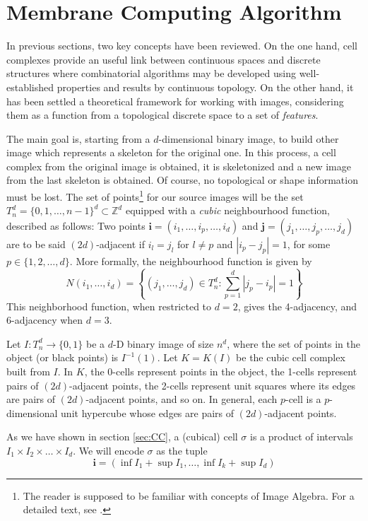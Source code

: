 \documentclass[journal]{IEEEtran}
\begin{document}
\section{Membrane Computing Algorithm}\label{sec:MCA}
In previous sections, two key concepts have been reviewed. On the one hand, cell
complexes provide an useful link between continuous spaces and discrete
structures where combinatorial algorithms may be developed using
well-established properties and results by continuous topology. On the other
hand, it has been settled a theoretical framework for working with images,
considering them as a function from a topological discrete space to a set of
{\it features}.

The main goal is, starting from a $d$-dimensional binary image, to build other
image which represents a skeleton for the original one. In this process, a cell
complex from the original image is obtained, it is skeletonized and a new image
from the last skeleton is obtained. Of course, no topological or shape
information must be lost. The set of points\footnote{The reader is supposed to
be familiar with concepts of Image Algebra. For a detailed text, see
\cite{DBLP:journals/cvgip/RitterWD90}.} for our source images
will be the set $T_n^d = \{0,1,\ldots, n-1\}^d \subset \mathbb{Z}^d$ equipped
with a \emph{cubic} neighbourhood function, described as follows: Two points
$\mathbf{i}=(i_1, \ldots, i_p, \ldots, i_d)$ and $\mathbf{j}=(j_1, \ldots, j_p,
\ldots, j_d)$ are to be said $(2d)$-adjacent if $i_l=j_l$ for $l \neq p$ and $|i_p
- j_p| = 1$, for some $p \in \{1, 2, \ldots, d\}$. More formally, the 
neighbourhood function is given by
$$
N(i_1,\ldots, i_d) = \left\{(j_1,\ldots, j_d) \in T_n^d: \sum_{p=1}^d |j_p-i_p| = 1 \right\}
$$ 
This neighborhood function, when restricted to $d=2$, gives the 4-adjacency,
and 6-adjacency when $d=3$.

Let $I:T_n^d \rightarrow \{0,1\}$ be a $d$-D binary image of size $n^d$, where
the set of points in the object (or black points) is $I^{-1}(1)$. Let $K = K(I)$
be the cubic cell complex built from $I$. In $K$, the 0-cells represent points
in the object, the 1-cells represent pairs of $(2d)$-adjacent points, the 2-cells
represent unit squares where its edges are pairs of $(2d)$-adjacent points, and so
on. In general, each $p$-cell is a $p$-dimensional unit hypercube whose edges
are pairs of $(2d)$-adjacent points.

As we have shown in section \ref{sec:CC}, a (cubical) cell $\sigma$ is a product of intervals
$I_1 \times I_2 \times \ldots \times I_d$. We will encode $\sigma$ as the tuple 
$$
\mathbf{i} = (\inf I_1 + \sup I_1, \ldots, \inf I_k + \sup I_d)
$$
\end{document}
